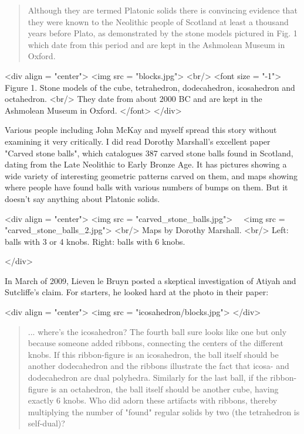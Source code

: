 \begin{quote}
   Although they are termed Platonic solids there is convincing 
   evidence that they were known to the Neolithic people of Scotland 
   at least a thousand years before Plato, as demonstrated by the stone
   models pictured in Fig. 1 which date from this period and are kept 
   in the Ashmolean Museum in Oxford.
\end{quote}

<div align = "center">
<img src = "blocks.jpg">
<br/>
<font size = "-1">
Figure 1.  Stone models of the cube, tetrahedron, dodecahedron,
icosahedron and octahedron. <br/> They date from about 2000 BC and are
kept in the Ashmolean Museum in Oxford.
</font>
</div>

Various people including John McKay and myself spread this story without
examining it very critically.  I did read Dorothy Marshall's excellent
paper "Carved stone balls", which catalogues 387 carved stone balls 
found in Scotland, dating from the Late Neolithic to Early Bronze Age.
It has pictures showing a wide variety of interesting geometric 
patterns carved on them, and maps showing where people have found 
balls with various numbers of bumps on them.  But it doesn't say 
anything about Platonic solids.

<div align = "center">
<img src = "carved_stone_balls.jpg">
\ \ 
<img src = "carved_stone_balls_2.jpg">
<br/>
Maps by Dorothy Marshall. <br/>
Left: balls with 3 or 4 knobs.
Right: balls with 6 knobs.

</div>


In March of 2009, Lieven le Bruyn posted a skeptical investigation of 
Atiyah and Sutcliffe's claim.  For starters, he looked hard at the
photo in their paper:

<div align = "center">
<img src = "icosahedron/blocks.jpg">
</div>

\begin{quote}
   ... where's the icosahedron?  The fourth ball sure looks like one 
   but only because someone added ribbons, connecting the centers of 
  the different knobs.  If this ribbon-figure is an icosahedron, the 
  ball itself should be another dodecahedron and the ribbons illustrate
  the fact that icosa- and dodecahedron are dual polyhedra.  Similarly 
  for the last ball, if the ribbon-figure is an octahedron, the ball 
  itself should be another cube, having exactly 6 knobs.  Who did adorn
  these artifacts with ribbons, thereby multiplying the number of 
  "found" regular solids by two (the tetrahedron is self-dual)? 
\end{quote}

